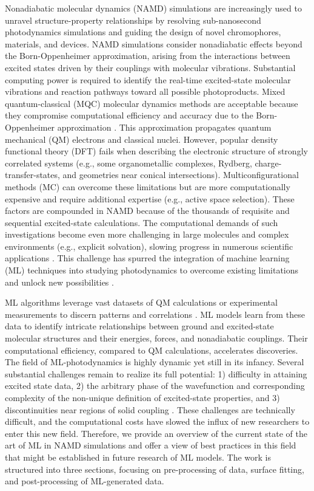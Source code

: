 \documentclass[9pt,bestpractices]{livecoms}
\begin{document}
Nonadiabatic molecular dynamics (NAMD) simulations are increasingly used to unravel structure-property relationships by resolving sub-nanosecond photodynamics simulations and guiding the design of novel chromophores, materials, and devices.  NAMD simulations consider nonadiabatic effects beyond the Born-Oppenheimer approximation, arising from the interactions between excited states driven by their couplings with molecular vibrations. Substantial computing power is required to identify the real-time excited-state molecular vibrations and reaction pathways toward all possible photoproducts. Mixed quantum-classical (MQC) molecular dynamics methods are acceptable because they compromise computational efficiency and accuracy due to the Born-Oppenheimer approximation \cite{RN90}. This approximation propagates quantum mechanical (QM) electrons and classical nuclei. However, popular density functional theory (DFT) fails when describing the electronic structure of strongly correlated systems (e.g., some organometallic complexes, Rydberg, charge-transfer-states, and geometries near conical intersections). Multiconfigurational methods (MC) can overcome these limitations but are more computationally expensive and require additional expertise (e.g., active space selection). These factors are compounded in NAMD because of the thousands of requisite and sequential excited-state calculations. The computational demands of such investigations become even more challenging in large molecules and complex environments (e.g., explicit solvation), slowing progress in numerous scientific applications \cite{RN89}. This challenge has spurred the integration of machine learning (ML) techniques into studying photodynamics to overcome existing limitations and unlock new possibilities \cite{RN131,RN98,RN121,RN129}.

ML algorithms leverage vast datasets of QM calculations or experimental measurements to discern patterns and correlations \cite{RN129, RN101, RN116, RN150}. ML models learn from these data to identify intricate relationships between ground and excited-state molecular structures and their energies, forces, and nonadiabatic couplings. Their computational efficiency, compared to QM calculations, accelerates discoveries. The field of ML-photodynamics is highly dynamic yet still in its infancy. Several substantial challenges remain to realize its full potential: 1)  difficulty in attaining excited state data, 2) the arbitrary phase of the wavefunction and corresponding complexity of the non-unique definition of excited-state properties, and 3) discontinuities near regions of solid coupling \cite{RN98, RN105}. These challenges are technically difficult, and the computational costs have slowed the influx of new researchers to enter this new field. Therefore, we provide an overview of the current state of the art of ML in NAMD simulations and offer a view of best practices in this field that might be established in future research of ML models. The work is structured into three sections, focusing on pre-processing of data, surface fitting, and post-processing of ML-generated data.
\end{document}

